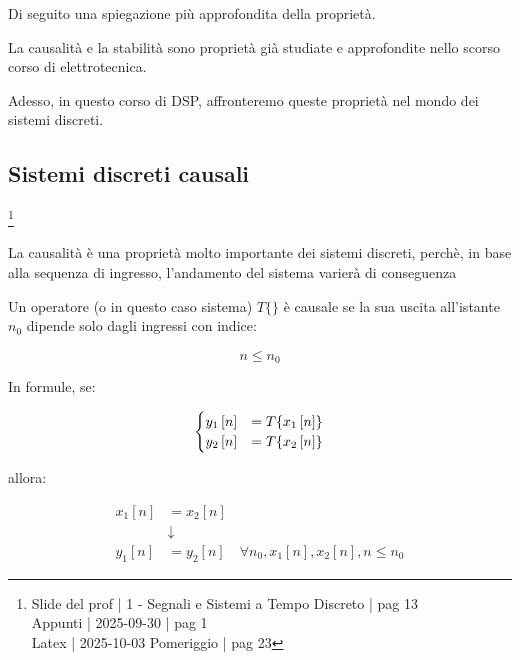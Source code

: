 Di seguito una spiegazione più approfondita della proprietà. \newline 

\begin{tcolorbox}
La causalità e la stabilità sono proprietà già studiate e approfondite nello scorso corso di elettrotecnica. \newline 

Adesso, in questo corso di DSP, affronteremo queste proprietà nel mondo dei sistemi discreti. 
\end{tcolorbox}

\newpage 

\subsection{Sistemi discreti causali}

\footnote{ 
    Slide del prof | 1 - Segnali e Sistemi a Tempo Discreto | pag 13\\
    Appunti | 2025-09-30 | pag 1 \\
    Latex | 2025-10-03 Pomeriggio | pag 23
}

\begin{tcolorbox}
La causalità è una proprietà molto importante dei sistemi discreti, 
perchè, in base alla sequenza di ingresso, 
l'andamento del sistema varierà di conseguenza  
\end{tcolorbox}

Un operatore (o in questo caso sistema) $T \{ \}$ è causale se 
la sua uscita all'istante $n_0$ dipende solo dagli ingressi con indice: 

{
    \Large 
    \begin{equation}
        n \leq n_0
    \end{equation}
}

In formule, se: 

{
    \Large 
    \begin{equation}
        \setlength{\jot}{10pt} %
        \begin{cases}
            y_1 \left[ n\right]
            &= 
            T \{ x_1 \left[ n\right]\}
            \\
            y_2 \left[ n\right]
            &= 
            T \{ x_2 \left[ n\right]\}
        \end{cases}
    \end{equation}
}

allora: 

{
    \Large 
    \begin{equation}
        \begin{split}
            x_1 \left[ n\right] 
            &= 
            x_2 \left[ n\right]
            \\
            &\downarrow
            \\
            y_1 \left[ n\right] 
            &= 
            y_2 \left[ n\right] 
            \quad
            \forall n_0, x_1 \left[ n\right], x_2 \left[ n\right], n \leq n_0
        \end{split}
    \end{equation}
}

